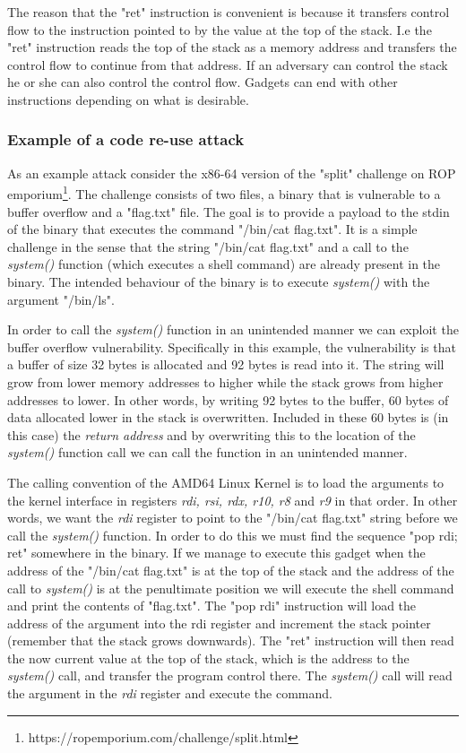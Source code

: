 The reason that the "ret" instruction is convenient is because it transfers control flow
to the instruction pointed to by the value at the top of the stack. I.e the "ret" instruction
reads the top of the stack as a memory address and transfers the control flow to continue
from that address. If an adversary can control the stack he or she can also control the
control flow. Gadgets can end with other instructions depending on what is desirable.

\subsubsection{Example of a code re-use attack}

As an example attack consider the x86-64 version of the "split" challenge on ROP emporium\footnote{https://ropemporium.com/challenge/split.html}.
The challenge consists of two files, a binary that is vulnerable to a buffer overflow and
a "flag.txt" file. The goal is to provide a payload to the stdin of the binary that executes
the command "/bin/cat flag.txt". It is a simple challenge in the sense that the string
"/bin/cat flag.txt" and a call to the \textit{system()} function (which executes a shell
command) are already present in the binary. The intended behaviour of the binary is to
execute \textit{system()} with the argument "/bin/ls".

In order to call the \textit{system()} function in an unintended manner we can exploit
the buffer overflow vulnerability. Specifically in this example, the vulnerability is that
a buffer of size 32 bytes is allocated and 92 bytes is read into it. The string will grow
from lower memory addresses to higher while the stack grows from higher addresses to
lower. In other words, by writing 92 bytes to the buffer, 60 bytes of data allocated lower
in the stack is overwritten. Included in these 60 bytes is (in this case) the
\textit{return address} and by overwriting this to the location of the \textit{system()}
function call we can call the function in an unintended manner.

The calling convention of the AMD64 Linux Kernel is to load the arguments to the kernel
interface in registers \textit{rdi, rsi, rdx, r10, r8} and \textit{r9} in that order\cite{system-v-abi}.
In other words, we want the \textit{rdi} register to point to the "/bin/cat flag.txt" string
before we call the \textit{system()} function. In order to do this we must find the sequence
"pop rdi; ret" somewhere in the binary. If we manage to execute this gadget when the
address of the "/bin/cat flag.txt" is at the top of the stack and the address of the call to
\textit{system()} is at the penultimate position we will execute the shell command and print
the contents of "flag.txt". The "pop rdi" instruction will load the address of the argument
into the rdi register and increment the stack pointer (remember that the stack grows
downwards). The "ret" instruction will then read the now current value at the top of the
stack, which is the address to the \textit{system()} call, and transfer the program
control there. The \textit{system()} call will read the argument in the \textit{rdi}
register and execute the command.

